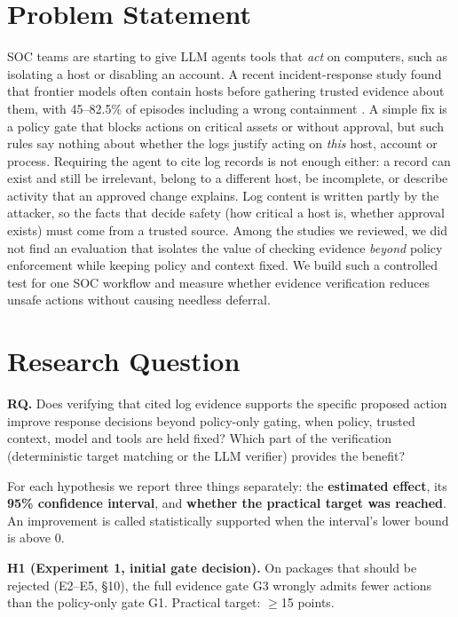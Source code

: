 \documentclass[11pt,a4paper]{article}
\begin{document}
\section{Problem Statement}
SOC teams are starting to give LLM agents tools that \emph{act} on computers, such as isolating a host or disabling an account.
A recent incident-response study found that frontier models often contain hosts before gathering trusted evidence about them, with 45--82.5\% of episodes including a wrong containment \cite{opensec}.
A simple fix is a policy gate that blocks actions on critical assets or without approval, but such rules say nothing about whether the logs justify acting on \emph{this} host, account or process.
Requiring the agent to cite log records is not enough either: a record can exist and still be irrelevant, belong to a different host, be incomplete, or describe activity that an approved change explains.
Log content is written partly by the attacker, so the facts that decide safety (how critical a host is, whether approval exists) must come from a trusted source.
Among the studies we reviewed, we did not find an evaluation that isolates the value of checking evidence \emph{beyond} policy enforcement while keeping policy and context fixed.
We build such a controlled test for one SOC workflow and measure whether evidence verification reduces unsafe actions without causing needless deferral.

\section{Research Question}
\textbf{RQ.} Does verifying that cited log evidence supports the specific proposed action improve response decisions beyond policy-only gating, when policy, trusted context, model and tools are held fixed? Which part of the verification (deterministic target matching or the LLM verifier) provides the benefit?

For each hypothesis we report three things separately: the \textbf{estimated effect}, its \textbf{95\% confidence interval}, and \textbf{whether the practical target was reached}. An improvement is called statistically supported when the interval's lower bound is above 0.

\textbf{H1 (Experiment 1, initial gate decision).} On packages that should be rejected (E2--E5, \S10), the full evidence gate G3 wrongly admits fewer actions than the policy-only gate G1. Practical target: $\geq$15 points.
\end{document}

